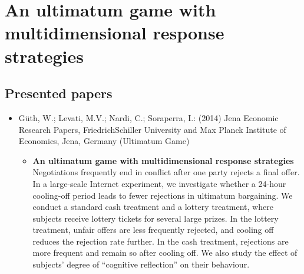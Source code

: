 

\chapter{An ultimatum game with multidimensional response strategies} %


\section{Presented papers}


\begin{itemize}
	\item Güth, W.; Levati, M.V.; Nardi, C.; Soraperra, I.: (2014) Jena Economic Research Papers, FriedrichSchiller University and Max Planck Institute of Economics, Jena, Germany (Ultimatum Game)
		\begin{itemize}
			\item \textbf{An ultimatum game with multidimensional response strategies} \\
			Negotiations frequently end in conflict after one party rejects a final offer. In a large-scale Internet experiment, we investigate whether a 24-hour cooling-off period leads to fewer rejections in ultimatum bargaining. We conduct a standard cash treatment and a lottery treatment, where subjects receive lottery tickets for several large prizes. In the lottery treatment, unfair offers are less frequently rejected, and cooling off reduces the rejection rate further. In the cash treatment, rejections are more frequent and remain so after cooling off. We also study the effect of subjects’ degree of “cognitive reflection” on their behaviour.
		\end{itemize}
\end{itemize}


\newpage